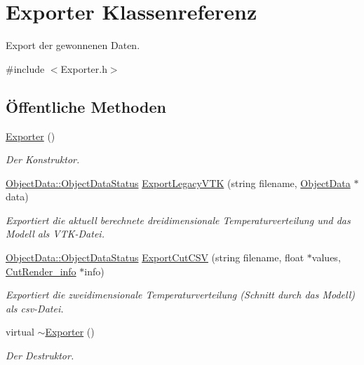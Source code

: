 \hypertarget{classExporter}{\section{Exporter Klassenreferenz}
\label{classExporter}
}


Export der gewonnenen Daten.  




{\ttfamily \#include $<$Exporter.\-h$>$}

\subsection*{Öffentliche Methoden}
\begin{DoxyCompactItemize}
\item 
\hyperlink{classExporter_a2a977cb5ac8f637fcb570e73f650eca0}{Exporter} ()
\begin{DoxyCompactList}\small\item\em Der Konstruktor. \end{DoxyCompactList}\item 
\hyperlink{classObjectData_a20e8cd3cd0f8af3b571b9393aa9e6484}{Object\-Data\-::\-Object\-Data\-Status} \hyperlink{classExporter_a59d03f0a582498e15397230b70ad1e80}{Export\-Legacy\-V\-T\-K} (string filename, \hyperlink{classObjectData}{Object\-Data} $\ast$data)
\begin{DoxyCompactList}\small\item\em Exportiert die aktuell berechnete dreidimensionale Temperaturverteilung und das Modell als V\-T\-K-\/\-Datei. \end{DoxyCompactList}\item 
\hyperlink{classObjectData_a20e8cd3cd0f8af3b571b9393aa9e6484}{Object\-Data\-::\-Object\-Data\-Status} \hyperlink{classExporter_ae2aa06b8c8c77e172801a1f77800ffd0}{Export\-Cut\-C\-S\-V} (string filename, float $\ast$values, \hyperlink{structUtils_1_1CutRender__info}{Cut\-Render\-\_\-info} $\ast$info)
\begin{DoxyCompactList}\small\item\em Exportiert die zweidimensionale Temperaturverteilung (Schnitt durch das Modell) als csv-\/\-Datei. \end{DoxyCompactList}\item 
virtual \hyperlink{classExporter_a44f24686958e01a543fd8b68b392658a}{$\sim$\-Exporter} ()
\begin{DoxyCompactList}\small\item\em Der Destruktor. \end{DoxyCompactList}\end{DoxyCompactItemize}
